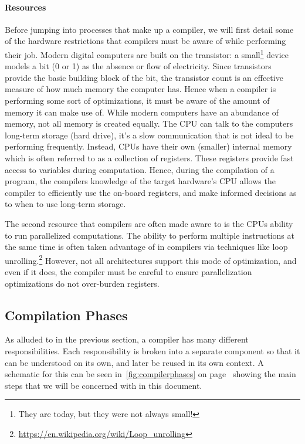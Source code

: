 \paragraph{Resources}
Before jumping into processes that make up a compiler, we will first detail some of the hardware restrictions that compilers must be aware of while performing their job.
Modern digital computers are built on the transistor: a small\footnote{They are today, but they were not always small!} device models a bit (0 or 1) as the absence or flow of electricity.
Since transistors provide the basic building block of the bit, the transistor count is an effective measure of how much memory the computer has.
Hence when a compiler is performing some sort of optimizations, it must be aware of the amount of memory it can make use of.
While modern computers have an abundance of memory, not all memory is created equally.
The \ac{CPU} can talk to the computers long-term storage (hard drive), it's a slow communication that is not ideal to be performing frequently.
Instead, \acp{CPU} have their own (smaller) internal memory which is often referred to as a collection of registers.
These registers provide fast access to variables during computation.
Hence, during the compilation of a program, the compilers knowledge of the target hardware's \ac{CPU} allows the compiler to efficiently use the on-board registers, and make informed decisions as to when to use long-term storage.

The second resource that compilers are often made aware to is the \acp{CPU} ability to run parallelized computations.
The ability to perform multiple instructions at the same time is often taken advantage of in compilers via techniques like loop unrolling.\footnote{\url{https://en.wikipedia.org/wiki/Loop_unrolling}}
However, not all architectures support this mode of optimization, and even if it does, the compiler must be careful to ensure parallelization optimizations do not over-burden registers.

\subsection{Compilation Phases}\label{sec:comp-phases}

As alluded to in the previous section, a compiler has many different responsibilities.
Each responsibility is broken into a separate component so that it can be understood on its own, and later be reused in its own context.
A schematic for this can be seen in~\cref{fig:compilerphases} on page~\pageref{fig:compilerphases} showing the main steps that we will be concerned with in this document.

